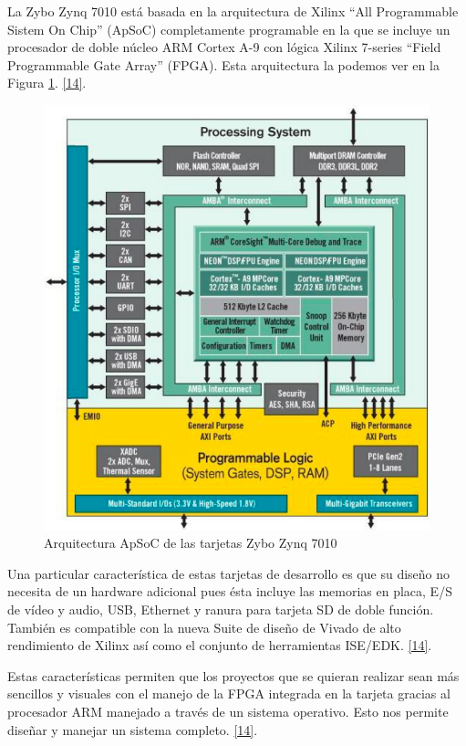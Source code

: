 \newpage
La Zybo Zynq 7010 está basada en la arquitectura de Xilinx ``All Programmable Sistem On Chip'' (ApSoC) completamente programable en la que se incluye un procesador de doble núcleo ARM Cortex A-9 con lógica Xilinx 7-series ``Field Programmable Gate Array'' (FPGA). Esta arquitectura la podemos ver en la Figura \ref{Arquitectura ApSoC de las tarjetas Zybo Zynq 7010}. \hyperlink{14}{[14]}.

\begin{figure}[h]
	\centering
	\includegraphics[scale=0.65]{Metodologia/MarcoTeorico/ApSoC.png}
	\caption{Arquitectura ApSoC de las tarjetas Zybo Zynq 7010}
	\label{Arquitectura ApSoC de las tarjetas Zybo Zynq 7010}
\end{figure}

Una particular característica de estas tarjetas de desarrollo es que su diseño no necesita de un hardware adicional pues ésta incluye las memorias en placa, E/S de vídeo y audio, USB, Ethernet y ranura para tarjeta SD de doble función. También es compatible con la nueva Suite de diseño de Vivado de alto rendimiento de Xilinx así como el conjunto de herramientas ISE/EDK. \hyperlink{14}{[14]}.

Estas características permiten que los proyectos que se quieran realizar sean más sencillos y visuales con el manejo de la FPGA integrada en la tarjeta gracias al procesador ARM manejado a través de un sistema operativo. Esto nos permite diseñar y manejar un sistema completo. \hyperlink{14}{[14]}.

